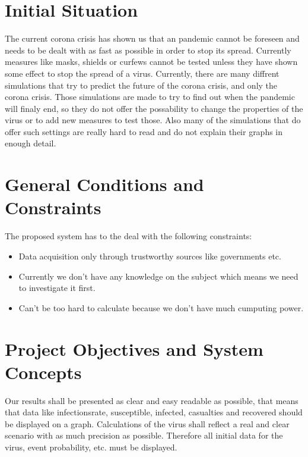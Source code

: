\documentclass[12pt]{article}
\theoremstyle{definition}
\begin{document}
\pagebreak

\section{Initial Situation}

The current corona crisis has shown us that an pandemic cannot be foreseen and needs to be dealt with as fast as possible in order to stop its spread.
Currently measures like masks, shields or curfews cannot be tested unless they have shown some effect to stop the spread of a virus.
Currently, there are many diffrent simulations that try to predict the future of the corona crisis,
and only the corona crisis. Those simulations are made to try to find out when the pandemic will finaly end,
so they do not offer the possability to change the properties of the virus or to add new measures to test those.
Also many of the simulations that do offer such settings are really hard to read and do not explain their graphs in enough detail.

\pagebreak

\section{General Conditions and Constraints}

The proposed system has to the deal with the following constraints:

\begin{itemize}
\item Data acquisition only through trustworthy sources like governments etc.
\item Currently we don't have any knowledge on the subject which means we need to investigate it first.
\item Can't be too hard to calculate because we don't have much cumputing power.
\end{itemize}

\pagebreak

\section{Project Objectives and System Concepts}

Our results shall be presented as clear and easy readable as possible, 
that means that data like infectionsrate, susceptible, infected, casualties and recovered should be displayed on a graph.
Calculations of the virus shall reflect a real and clear scenario with as much precision as possible.
Therefore all initial data for the virus, event probability, etc. must be displayed.
\end{document}
